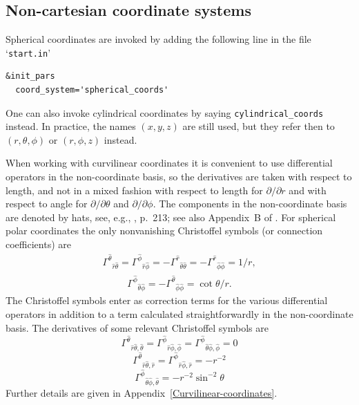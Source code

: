 \documentclass[\mydriver,12pt,twoside,notitlepage,a4paper]{article}
\makeatletter
\newcommand{\code}[1]{\texttt{#1}}
\newcommand{\file}[2][]{%
  \def\index@{#1}%
  `\texttt{#2}'%
  \ifx\index@\@empty\index[file]{#2@\texttt{#2}}%
  \else\index[file]{#1@\texttt{#1}}%
  \fi%
}
\makeatother
\begin{document}

\subsection{Non-cartesian coordinate systems}
\label{Coordinate-systems}

Spherical coordinates are invoked by adding the following line
in the file \file{start.in}
\begin{verbatim}
&init_pars
  coord_system='spherical_coords'
\end{verbatim}
One can also invoke cylindrical coordinates by saying
\code{cylindrical_coords} instead.
In practice, the names $(x,y,z)$ are still used, but they refer then
to $(r,\theta,\phi)$ or $(r,\phi,z)$ instead.

When working with curvilinear coordinates it is convenient to use
differential operators in the non-coordinate basis, so the derivatives
are taken with respect to length, and not in a mixed fashion
with respect to length for $\partial/\partial r$ and with respect
to angle for $\partial/\partial\theta$ and $\partial/\partial\phi$.
The components in the non-coordinate basis are denoted by hats, see, e.g.,
\cite{MTW}, p.~213; see also Appendix~B of \cite{MTBM09}.
For spherical polar coordinates the only nonvanishing Christoffel
symbols (or connection coefficients) are
\begin{eqnarray}
{\Gamma^{\hat\theta}}_{{\hat r}{\hat\theta}}
={\Gamma^{\hat\phi}}_{{\hat r}{\hat\phi}}
=-{\Gamma^{\hat r}}_{{\hat\theta}{\hat\theta}}
=-{\Gamma^{\hat r}}_{{\hat\phi}{\hat\phi}}
=1/r,
\end{eqnarray}
\begin{eqnarray}
{\Gamma^{\hat\phi}}_{{\hat\theta}{\hat\phi}}
=-{\Gamma^{\hat\theta}}_{{\hat\phi}{\hat\phi}}
=\cot\theta/r.
\end{eqnarray}
The Christoffel symbols enter as correction terms for the various
differential operators in addition to a term calculated straightforwardly
in the non-coordinate basis.
The derivatives of some relevant Christoffel symbols are
\begin{equation}
{\Gamma^{\hat\theta}}_{\hat r\hat\theta,\hat\theta}
={\Gamma^{\hat\phi}}_{\hat r\hat\phi,\hat\phi}
={\Gamma^{\hat\phi}}_{\hat\theta\hat\phi,\hat\phi}=0
\end{equation}
\begin{equation}
{\Gamma^{\hat\theta}}_{\hat r\hat\theta,\hat r}
={\Gamma^{\hat\phi}}_{\hat r\hat\phi,\hat r}=-r^{-2}
\end{equation}
\begin{equation}
{\Gamma^{\hat\phi}}_{\hat\theta\hat\phi,\hat\theta}=-r^{-2}\sin^{-2}\!\theta
\end{equation}
Further details are given in Appendix~\ref{Curvilinear-coordinates}.
\end{document}
